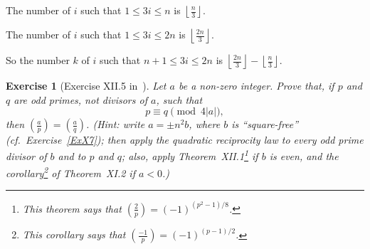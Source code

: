 \documentclass[12pt,letterpaper]{article}
\newtheorem{exer}[thm]{Exercise}
\theoremstyle{definition}
\begin{document}
The number of $i$ such that $1\le 3i\le n$ is $\left\lfloor\frac{n}{3}\right\rfloor$. 

The number of $i$ such that $1\le 3i\le 2n$ is $\left\lfloor\frac{2n}{3}\right\rfloor$. 

So the number $k$ of $i$ such that $n+1\le 3i\le 2n$ is $\left\lfloor\frac{2n}{3}\right\rfloor-\left\lfloor\frac{n}{3}\right\rfloor$. 

\begin{exer}[Exercise XII.5 in~\cite{weil1979}]
Let $a$ be a non-zero integer. Prove that, if $p$ and $q$ are odd primes, not divisors of $a$, such that 
$$
p\equiv q\pmod{4|a|},
$$ 
then $(\frac{a}{p})=(\frac{a}{q})$. (Hint: write $a=\pm n^2b$, where $b$ is ``square-free'' (cf.~Exercise~\ref{ExX7}); then apply the quadratic reciprocity law to every odd prime divisor of $b$ and to $p$ and $q$; also, apply Theorem~XII.1\footnote{This theorem says that $(\frac{2}{p})=(-1)^{(p^2-1)/8}$.} if $b$ is even, and the corollary\footnote{This corollary says that $(\frac{-1}{p})=(-1)^{(p-1)/2}$.} of Theorem~XI.2 if $a<0$.)
\end{exer}
\end{document}
